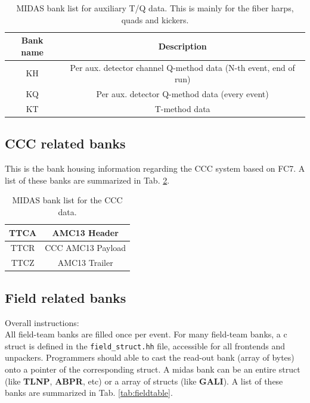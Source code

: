 \begin{table}[htbp]
\centering
\caption{MIDAS bank list for auxiliary T/Q data. This is mainly for the fiber harps, quads and kickers.}
\begin{tabular}{|c|c|}
\hline 
Bank name  & Description \\
\hline
KH &  Per aux. detector channel Q-method data (N-th event, end of run)\\
\hline
KQ &  Per aux. detector Q-method data (every event)\\
\hline
KT & T-method data \\
\hline
\end{tabular} 
\label{tab:auxtable}
\end{table}

\subsection{CCC related banks}

This is the bank housing information regarding the CCC system based on FC7.
A list of these banks are summarized in Tab. \ref{tab:ccctable}.

\begin{table}[htbp]
\centering
\caption{MIDAS bank list for the CCC data.}
\begin{tabular}{|c|c|}
\hline 
TTCA & AMC13 Header \\
\hline
TTCR & CCC AMC13 Payload\\
\hline
TTCZ & AMC13 Trailer \\
\hline
\end{tabular} 
\label{tab:ccctable}
\end{table}


\subsection{Field related banks}

Overall instructions: \\

All field-team banks are filled once per event.
For many field-team banks, a c struct is defined in the \verb+field_struct.hh+ file, accessible for all frontends and unpackers. Programmers should able to cast the read-out bank (array of bytes) onto a pointer of the corresponding struct. A midas bank can be an entire struct (like \textbf{TLNP}, \textbf{ABPR}, etc) or a array of structs (like \textbf{GALI}). A list of these banks are summarized in Tab. \ref{tab:fieldtable}.


